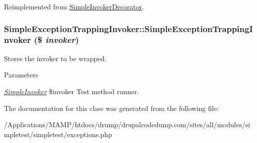 Reimplemented from \hyperlink{class_simple_invoker_decorator_a95431eef2d336fc92dbbc719a66cda32}{SimpleInvokerDecorator}.\hypertarget{class_simple_exception_trapping_invoker_a9077cacfa2f5076f407b475f86036d21}{
\subsubsection[{SimpleExceptionTrappingInvoker}]{\setlength{\rightskip}{0pt plus 5cm}SimpleExceptionTrappingInvoker::SimpleExceptionTrappingInvoker (\$ {\em invoker})}}
\label{class_simple_exception_trapping_invoker_a9077cacfa2f5076f407b475f86036d21}
Stores the invoker to be wrapped. 
\begin{DoxyParams}{Parameters}
\item[{\em \hyperlink{class_simple_invoker}{SimpleInvoker}}]\$invoker Test method runner. \end{DoxyParams}


The documentation for this class was generated from the following file:\begin{DoxyCompactItemize}
\item 
/Applications/MAMP/htdocs/drump/drupalcodedump.com/sites/all/modules/simpletest/simpletest/exceptions.php\end{DoxyCompactItemize}
